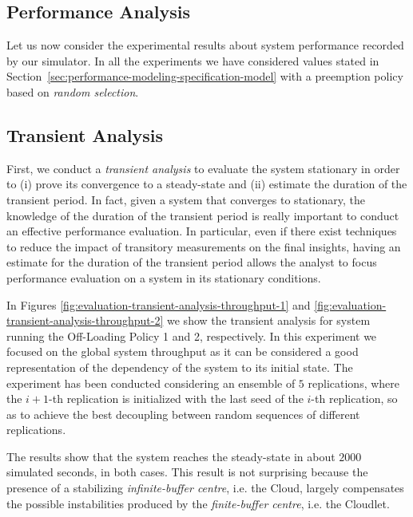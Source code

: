 \subsection{Performance Analysis}
\label{sec:evaluation-performance-analysis}
Let us now consider the experimental results about system performance recorded by our simulator.
In all the experiments we have considered values stated in Section~\ref{sec:performance-modeling-specification-model} with a preemption policy based on \textit{random selection}.

\subsection{Transient Analysis}
\label{sec:evaluation-transient-analysis}
First, we conduct a \textit{transient analysis} to evaluate the system stationary in order to (i) prove its convergence to a steady-state and (ii) estimate the duration of the transient period.
%
In fact, given a system that converges to stationary, the knowledge of the duration of the transient period is really important to conduct an effective performance evaluation. 
%
In particular, even if there exist techniques to reduce the impact of transitory measurements on the final insights, having an estimate for the duration of the transient period allows the analyst to focus performance evaluation on a system in its stationary conditions.

In Figures \ref{fig:evaluation-transient-analysis-throughput-1} and \ref{fig:evaluation-transient-analysis-throughput-2} we show the transient analysis for system running the Off-Loading Policy 1 and 2, respectively. 
In this experiment we focused on the global system throughput as it can be considered a good representation of the dependency of the system to its initial state.
The experiment has been conducted considering an ensemble of $5$ replications, where the $i+1$-th replication is initialized with the last seed of the $i$-th replication, so as to achieve the best decoupling between random sequences of different replications.

The results show that the system reaches the steady-state in about $ 2000$ simulated seconds, in both cases.
This result is not surprising because the presence of a stabilizing \textit{infinite-buffer centre}, i.e. the Cloud, largely compensates the possible instabilities produced by the \textit{finite-buffer centre}, i.e. the Cloudlet.


